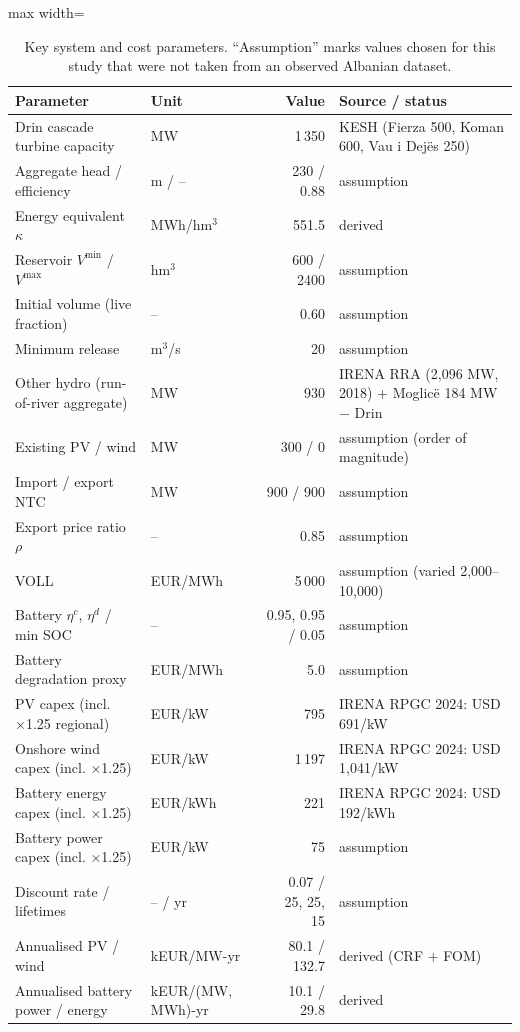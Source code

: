 \begin{table}[htbp]
\centering
\footnotesize
\caption{Key system and cost parameters. ``Assumption'' marks values chosen for this study that were not taken from an observed Albanian dataset.}
\label{tab:assumptions}
\begin{adjustbox}{max width=\linewidth}
\begin{tabular}{p{5.2cm}lrp{5.0cm}}
\toprule
Parameter & Unit & Value & Source / status \\
\midrule
Drin cascade turbine capacity & MW & 1\,350 & KESH (Fierza 500, Koman 600, Vau i Dejës 250) \\
Aggregate head / efficiency & m / -- & 230 / 0.88 & assumption \\
Energy equivalent $\kappa$ & MWh/hm$^3$ & 551.5 & derived \\
Reservoir $V^{\min}$ / $V^{\max}$ & hm$^3$ & 600 / 2400 & assumption \\
Initial volume (live fraction) & -- & 0.60 & assumption \\
Minimum release & m$^3$/s & 20 & assumption \\
Other hydro (run-of-river aggregate) & MW & 930 & IRENA RRA (2,096 MW, 2018) + Moglicë 184 MW $-$ Drin \\
Existing PV / wind & MW & 300 / 0 & assumption (order of magnitude) \\
Import / export NTC & MW & 900 / 900 & assumption \\
Export price ratio $\rho$ & -- & 0.85 & assumption \\
VOLL & EUR/MWh & 5\,000 & assumption (varied 2,000--10,000) \\
Battery $\eta^c$, $\eta^d$ / min SOC & -- & 0.95, 0.95 / 0.05 & assumption \\
Battery degradation proxy & EUR/MWh & 5.0 & assumption \\
PV capex (incl. ×1.25 regional) & EUR/kW & 795 & IRENA RPGC 2024: USD 691/kW \\
Onshore wind capex (incl. ×1.25) & EUR/kW & 1\,197 & IRENA RPGC 2024: USD 1,041/kW \\
Battery energy capex (incl. ×1.25) & EUR/kWh & 221 & IRENA RPGC 2024: USD 192/kWh \\
Battery power capex (incl. ×1.25) & EUR/kW & 75 & assumption \\
Discount rate / lifetimes & -- / yr & 0.07 / 25, 25, 15 & assumption \\
Annualised PV / wind & kEUR/MW-yr & 80.1 / 132.7 & derived (CRF + FOM) \\
Annualised battery power / energy & kEUR/(MW, MWh)-yr & 10.1 / 29.8 & derived \\
\bottomrule
\end{tabular}
\end{adjustbox}
\end{table}
